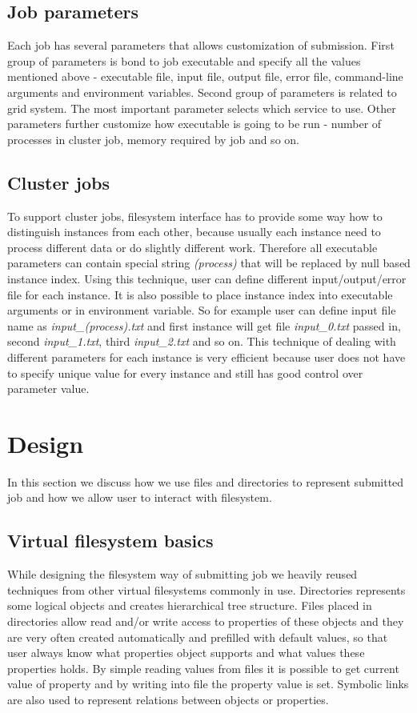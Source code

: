 \documentclass[a4paper,10pt,twocolumn]{article}
\newcommand{\code}[1]{\textit{#1}}
\begin{document}
\subsection{Job parameters}
Each job has several parameters that allows customization of submission. First group of parameters is bond to job executable and specify all the values mentioned above - executable file, input file, output file, error file, command-line arguments and environment variables. Second group of parameters is related to grid system. The most important parameter selects which service to use. Other parameters further customize how executable is going to be run - number of processes in cluster job, memory required by job and so on.

\subsection{Cluster jobs}
To support cluster jobs, filesystem interface has to provide some way how to distinguish instances from each other, because usually each instance need to process different data or do slightly different work. Therefore all executable parameters can contain special string \code{\textdollar(process)} that will be replaced by null based instance index. Using this technique, user can define different input/output/error file for each instance. It is also possible to place instance index into executable arguments or in environment variable. So for example user can define input file name as \code{input\_\textdollar(process).txt} and first instance will get file \code{input\_0.txt} passed in, second \code{input\_1.txt}, third \code{input\_2.txt} and so on. This technique of dealing with different parameters for each instance is very efficient because user does not have to specify unique value for every instance and still has good control over parameter value.



\section{Design}

In this section we discuss how we use files and directories to represent submitted job and how we allow user to interact with filesystem.

\subsection{Virtual filesystem basics}
While designing the filesystem way of submitting job we heavily reused techniques from other virtual filesystems commonly in use. Directories represents some logical objects and creates hierarchical tree structure. Files placed in directories allow read and/or write access to properties of these objects and they are very often created automatically and prefilled with default values, so that user always know what properties object supports and what values these properties holds. By simple reading values from files it is possible to get current value of property and by writing into file the property value is set. Symbolic links are also used to represent relations between objects or properties.
\end{document}
